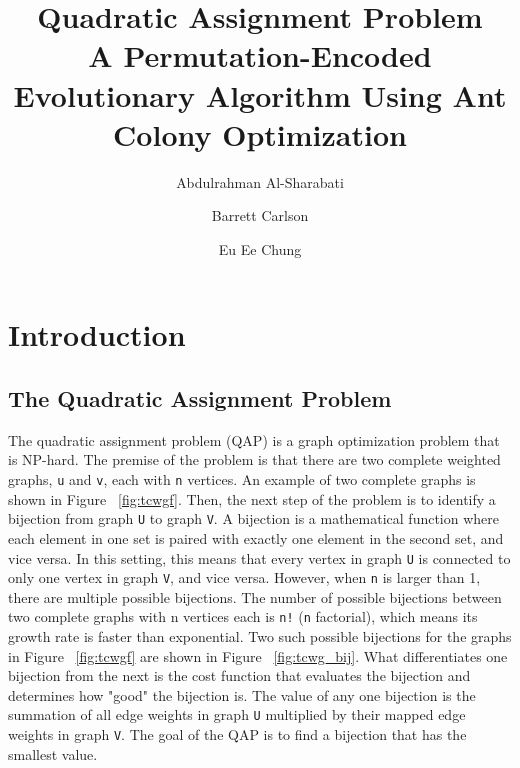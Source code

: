 \documentclass[sigconf]{acmart}
\begin{document}
\title{Quadratic Assignment Problem \\
    \large A Permutation-Encoded Evolutionary Algorithm Using Ant Colony Optimization
}

\author{Abdulrahman Al-Sharabati}

\author{Barrett Carlson}

\author{Eu Ee Chung}

\begin{abstract}
\end{abstract}

\maketitle

\section {Introduction}

\subsection {The Quadratic Assignment Problem}
The quadratic assignment problem (QAP) is a graph optimization problem that is NP-hard. The premise of the problem is that there are two complete weighted graphs, \verb|u| and \verb|v|, each with \verb|n| vertices. An example of two complete graphs is shown in Figure ~\ref{fig:tcwgf}. Then, the next step of the problem is to identify a bijection from graph \verb|U| to graph \verb|V|. A bijection is a mathematical function where each element in one set is paired with exactly one element in the second set, and vice versa. In this setting, this means that every vertex in graph \verb|U| is connected to only one vertex in graph \verb|V|, and vice versa. However, when \verb|n| is larger than 1, there are multiple possible bijections. The number of possible bijections between two complete graphs with n vertices each is \verb|n!| (\verb|n| factorial), which means its growth rate is faster than exponential. Two such possible bijections for the graphs in Figure ~\ref{fig:tcwgf} are shown in Figure ~\ref{fig:tcwg_bij}. What differentiates one bijection from the next is the cost function that evaluates the bijection and determines how "good" the bijection is. The value of any one bijection is the summation of all edge weights in graph \verb|U| multiplied by their mapped edge weights in graph \verb|V|. The goal of the QAP is to find a bijection that has the smallest value.
\end{document}
